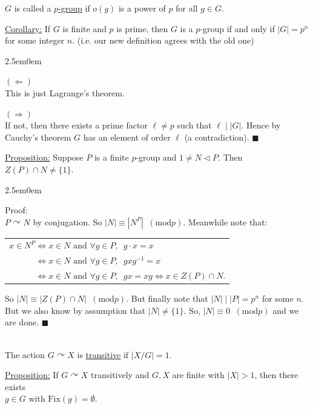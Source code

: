 \documentclass{book}
\newcommand{\hTwo}{%
\color{Black}%
   \fontsize{13}{15}\selectfont%
}
\newcommand{\myComment}{%
   \color{RawerSienna}%
   \fontsize{12}{14}\selectfont%
}
\newcommand{\exTwo}{%
   \color{Purple}%
   \fontsize{13}{15}\selectfont%
}
\newcommand{\exThreeP}{%
   \color{RedViolet}%
   \fontsize{12}{14}\selectfont%
}
\newenvironment{myIndent}{%
   \begin{adjustwidth}{2.5em}{0em}%
}{%
   \end{adjustwidth}%
}
\newcommand{\udefine}[1]{{%
   \setulcolor{Red}%
   \setul{0.14em}{0.07em}%
   \ul{#1}%
}}
\newcommand{\gap}{\phantom{2}}
\newcommand{\divides}{\mathop{\mid}}
\newcommand{\mMod}[1]{\phantom{a}(\mathrel{\mathrm{mod}} #1)}
\newcommand{\Fix}{\mathrm{Fix}}
\newcommand{\mySepTwo}[1][.]{%
   {\noindent\color{#1}{\rule{6.5in}{0.5mm}}}\\%
}
\newcommand{\retTwo}{\hfill\bigbreak}
\begin{document}
\setul{0.14em}{0.07em}
\calibri

\hTwo $G$ is called a \udefine{$p$-group} if $o(g)$ is a power of $p$ for all $g \in G$.\retTwo

\exTwo\ul{Corollary:} If $G$ is finite and $p$ is prime, then $G$ is a $p$-group if and only if $|G| = p^n$ for some integer $n$. {\myComment(i.e. our new definition agrees with the old one)}
\begin{myIndent}\exThreeP
	$(\Longleftarrow)$\\
	This is just Lagrange's theorem.\retTwo

	$(\Longrightarrow)$\\
	If not, then there exists a prime factor $\ell \neq p$ such that $\ell \divides |G|$. Hence by Cauchy's theorem $G$ has an element of order $\ell$ (a contradiction). $\blacksquare$\retTwo
\end{myIndent}

\ul{Proposition:} Suppose $P$ is a finite $p$-group and $1 \neq N \lhd P$. Then $Z(P) \cap N \neq \{1\}$.

\begin{myIndent}\exThreeP
	Proof:\\
	$P \curvearrowright N$ by conjugation. So $|N| \equiv |N^P| \mMod{p}$. Meanwhile note that:

	{\centering\begin{tabular}{l}
		$x \in N^P \Longleftrightarrow x \in N \text{ and } \forall g \in P,\gap g \cdot x = x$\\
		$\phantom{x \in N^P} \Longleftrightarrow x \in N \text{ and } \forall g \in P,\gap gxg^{-1} = x$\\
		$\phantom{x \in N^P} \Longleftrightarrow x \in N \text{ and } \forall g \in P,\gap gx = xg \Longleftrightarrow x \in Z(P) \cap N$.\\
	\end{tabular}\retTwo\par}

	So $|N| \equiv |Z(P) \cap N| \mMod{p}$. But finally note that $|N| \divides |P| = p^n$ for some $n$. But we also know by assumption that $|N| \neq \{1\}$. So, $|N| \equiv 0 \mMod{p}$ and we are done. $\blacksquare$\retTwo
\end{myIndent}

\hTwo\mySepTwo

The action $G \curvearrowright X$ is \udefine{transitive} if $|X/G| = 1$.\retTwo

\exTwo\ul{Proposition:} If $G \curvearrowright X$ transitively and $G, X$ are finite with $|X| > 1$, then there exists\\ $g \in G$ with $\Fix(g) = \emptyset$.
\end{document}
